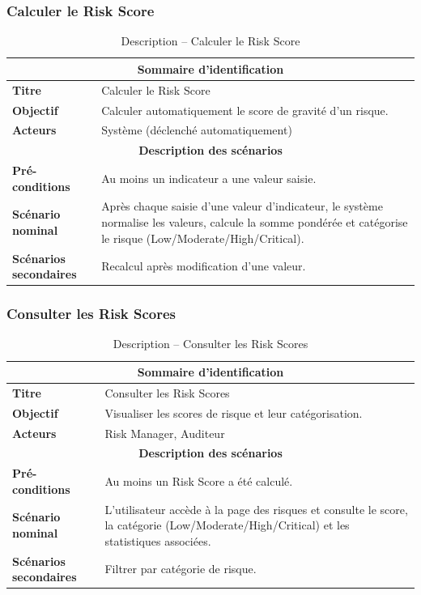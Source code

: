 \subsubsection{Calculer le Risk Score}
\begin{table}[H]
\centering
\renewcommand{\arraystretch}{1.3}
\begin{tabular}{@{}p{}p{}@{}}
\hline
\multicolumn{2}{c}{\textbf{Sommaire d'identification}} \\
\hline
\textbf{Titre} & Calculer le Risk Score \\
\textbf{Objectif} & Calculer automatiquement le score de gravité d'un risque. \\
\textbf{Acteurs} & Système (déclenché automatiquement) \\
\hline
\multicolumn{2}{c}{\textbf{Description des scénarios}} \\
\hline
\textbf{Pré-conditions} & Au moins un indicateur a une valeur saisie. \\
\textbf{Scénario nominal} & Après chaque saisie d'une valeur d'indicateur, le système normalise les valeurs, calcule la somme pondérée et catégorise le risque (Low/Moderate/High/Critical). \\
\textbf{Scénarios secondaires} & Recalcul après modification d'une valeur. \\
\hline
\end{tabular}
\caption{Description -- Calculer le Risk Score}
\end{table}

\subsubsection{Consulter les Risk Scores}
\begin{table}[H]
\centering
\renewcommand{\arraystretch}{1.3}
\begin{tabular}{@{}p{}p{}@{}}
\hline
\multicolumn{2}{c}{\textbf{Sommaire d'identification}} \\
\hline
\textbf{Titre} & Consulter les Risk Scores \\
\textbf{Objectif} & Visualiser les scores de risque et leur catégorisation. \\
\textbf{Acteurs} & Risk Manager, Auditeur \\
\hline
\multicolumn{2}{c}{\textbf{Description des scénarios}} \\
\hline
\textbf{Pré-conditions} & Au moins un Risk Score a été calculé. \\
\textbf{Scénario nominal} & L'utilisateur accède à la page des risques et consulte le score, la catégorie (Low/Moderate/High/Critical) et les statistiques associées. \\
\textbf{Scénarios secondaires} & Filtrer par catégorie de risque. \\
\hline
\end{tabular}
\caption{Description -- Consulter les Risk Scores}
\end{table}

